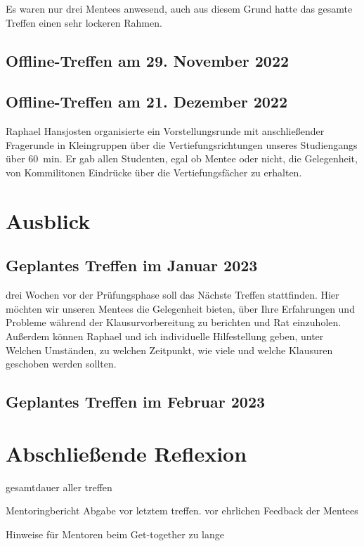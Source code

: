\documentclass[
    paper=A4,
    div=calc,
    numbers=noendperiod
]{scrartcl}
\begin{document}
        Es waren nur drei Mentees anwesend, auch aus diesem Grund hatte das gesamte Treffen einen sehr lockeren Rahmen.

    \subsection{Offline-Treffen am 29. November 2022}

    \subsection{Offline-Treffen am 21. Dezember 2022}
        Raphael Hansjosten organisierte ein Vorstellungsrunde mit anschließender Fragerunde in Kleingruppen über die Vertiefungsrichtungen unseres Studiengangs über \SI{60}{min}. Er gab allen Studenten, egal ob Mentee oder nicht, die Gelegenheit, von Kommilitonen Eindrücke über die Vertiefungsfächer zu erhalten.

\section{Ausblick}

    \subsection{Geplantes Treffen im Januar 2023}
        drei Wochen vor der Prüfungsphase soll das Nächste Treffen stattfinden. Hier möchten wir unseren Mentees die Gelegenheit bieten, über Ihre Erfahrungen und Probleme während der Klausurvorbereitung zu berichten und Rat einzuholen. Außerdem können Raphael und ich individuelle Hilfestellung geben, unter Welchen Umständen, zu welchen Zeitpunkt, wie viele und welche Klausuren geschoben werden sollten. 

    \subsection{Geplantes Treffen im Februar 2023}

\section{Abschließende Reflexion}

    gesamtdauer aller treffen

    Mentoringbericht Abgabe vor letztem treffen. vor ehrlichen Feedback der Mentees

    Hinweise für Mentoren beim Get-together zu lange
\end{document}
